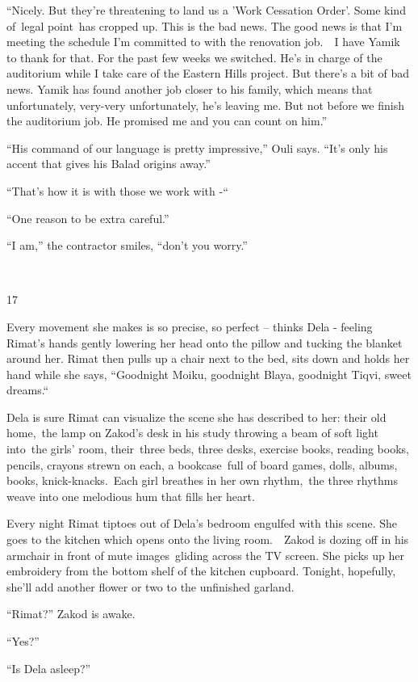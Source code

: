 \documentclass[twoside,11pt]{book}
\begin{document}
``Nicely. But they're threatening to land us a 'Work Cessation Order'. Some kind of~legal point~has cropped
up. This is the bad news. The good news is that I'm meeting the schedule I'm committed to with the renovation job.\ \ I
have Yamik to thank for that. For the past few weeks we switched. He's in charge of the auditorium while I take care of
the Eastern Hills project. But there's a bit of bad news. Yamik has found another job closer to his family, which means
that unfortunately, very{}-very unfortunately, he's leaving me. But not before we finish the auditorium job. He
promised me and you can count on him.''

``His command of our language is pretty impressive,'' Ouli says. ``It's only his
accent that gives his Balad origins away.''

``That's how it is with those we work with -``\ 

``One reason to be extra careful.''

``I am,'' the contractor smiles, ``don't you worry.''

~

17

Every movement she makes is so precise, so perfect -- thinks Dela - feeling Rimat's hands gently lowering her head onto
the pillow and tucking the blanket around her. Rimat then pulls up a chair next to the bed, sits down and holds her
hand while she says, ``Goodnight Moiku, goodnight Blaya, goodnight Tiqvi, sweet dreams.``\ 

Dela is sure Rimat can visualize the scene she has described to her: their old home,\ the lamp on Zakod's desk in his
study throwing a beam of soft light into\ the girls' room, their\ three beds, three desks, exercise books, reading
books, pencils, crayons strewn on each, a bookcase~full of board games, dolls, albums, books, knick-knacks.\ Each girl
breathes in her own rhythm,\ the three rhythms weave into one melodious hum that fills her heart.\ 

Every night Rimat tiptoes out of Dela's bedroom engulfed with this scene. She goes to the kitchen which opens onto the
living room.\ \ Zakod is dozing off in his armchair in front of mute images~gliding across the TV screen. She picks up
her embroidery from the bottom shelf of the kitchen cupboard. Tonight, hopefully, she'll add another flower or two to
the unfinished garland.

``Rimat?'' Zakod is awake. 

``Yes?''

``Is Dela asleep?'' 
\end{document}
